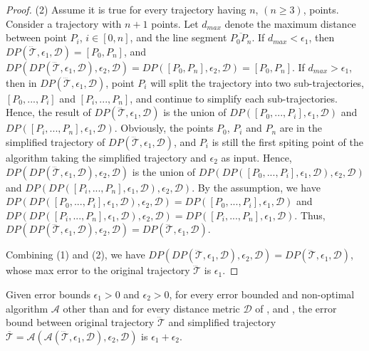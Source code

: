 \begin{proof}
	(2) Assume it is true for every trajectory  having $n$, $(n \ge 3)$, points.
	Consider a trajectory with $n+1$ points. Let $d_{max}$ denote the maximum distance between point $P_i$, $i \in [0,n]$, and the line segment $\overline{P_0P_{n}}$. 
	If $d_{max}<\epsilon_1$, then $DP(\dddot{\mathcal{T}}, \epsilon_1, \mathcal{D})=[P_0, P_{n}]$, and $DP(DP(\dddot{\mathcal{T}}, \epsilon_1, \mathcal{D}), \epsilon_2, \mathcal{D}) = DP([P_0, P_{n}], \epsilon_2, \mathcal{D})=[P_0, P_{n}]$.
	If $d_{max} > \epsilon_1$, then in $DP(\dddot{\mathcal{T}}, \epsilon_1, \mathcal{D})$, point $P_i$ will split the trajectory  into two sub-trajectories, \ie $[P_0, ..., P_i]$ and $[P_{i}, ..., P_{n}]$, and continue to simplify each sub-trajectories. Hence, the result of $DP(\dddot{\mathcal{T}}, \epsilon_1, \mathcal{D})$ is the union of $DP([P_0, ..., P_i], \epsilon_1, \mathcal{D})$ and $DP([P_i, ..., P_n], \epsilon_1, \mathcal{D})$.
	Obviously, the points $P_0$, $P_i$ and $P_n$ are in the simplified trajectory of $DP(\dddot{\mathcal{T}}, \epsilon_1, \mathcal{D})$, and $P_i$ is still the first spiting point of the \dpa algorithm taking the simplified trajectory and $\epsilon_2$ as input. Hence, $DP(DP(\dddot{\mathcal{T}}, \epsilon_1, \mathcal{D}), \epsilon_2, \mathcal{D})$ is the union of $DP(DP([P_0, ..., P_i], \epsilon_1, \mathcal{D}), \epsilon_2, \mathcal{D})$ and $DP(DP([P_i, ..., P_n], \epsilon_1, \mathcal{D}), \epsilon_2, \mathcal{D})$. By the assumption, we have $DP(DP([P_0, ..., P_i], \epsilon_1, \mathcal{D}), \epsilon_2, \mathcal{D}) = DP([P_0, ..., P_i], \epsilon_1, \mathcal{D})$ and $DP(DP([P_i, ..., P_n], \epsilon_1, \mathcal{D}), \epsilon_2, \mathcal{D}) = DP([P_i, ..., P_n], \epsilon_1, \mathcal{D})$. Thus, $DP(DP(\dddot{\mathcal{T}}, \epsilon_1, \mathcal{D}), \epsilon_2, \mathcal{D}) = DP(\dddot{\mathcal{T}}, \epsilon_1, \mathcal{D})$.
	
	Combining (1) and (2), we have $DP(DP(\dddot{\mathcal{T}}, \epsilon_1, \mathcal{D}), \epsilon_2, \mathcal{D}) = DP(\dddot{\mathcal{T}}, \epsilon_1, \mathcal{D})$, whose max error to the original trajectory $\dddot{\mathcal{T}}$ is $\epsilon_1$.

\end{proof}




\begin{theorem}
	\label{theo-aging-distance}
	Given error bounds $\epsilon_1>0$ and $\epsilon_2>0$, for every error bounded and non-optimal \lsa algorithm $\mathcal{A}$ other than \dpa and for every distance metric $\mathcal{D}$ of \ped, \sed and \dad, the error bound between original trajectory $\dddot{\mathcal{T}}$ and simplified trajectory $\overline{\mathcal{T}}=\mathcal{A}(\mathcal{A}(\dddot{\mathcal{T}}, \epsilon_1, \mathcal{D}), \epsilon_2, \mathcal{D})$ is $\epsilon_1+ \epsilon_2$.
\end{theorem}

